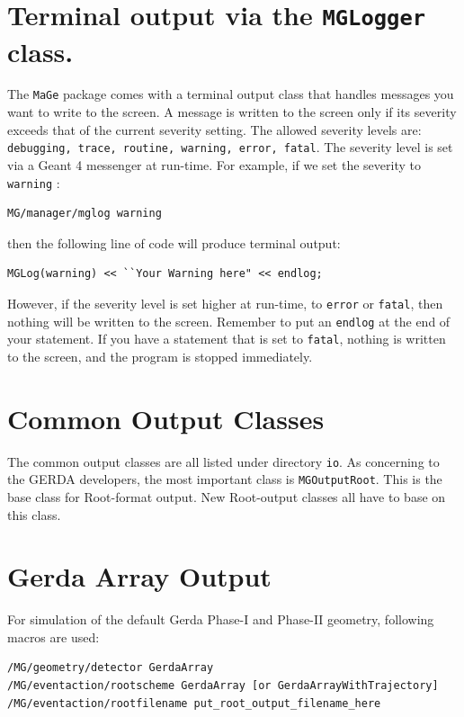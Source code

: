 \section{Terminal output via the 
 \texttt{M\-G\-L\-o\-g\-g\-e\-r} class.}
\label{IO_MGLogger}

    The \nolinkurl{MaGe} package comes with a terminal output class
   that handles messages you want to write to the screen. A message is written
   to the screen only if its severity exceeds that of the current severity 
   setting. The allowed severity levels
   are: \nolinkurl{debugging, trace, routine, warning, error, fatal}.
   The severity level is set via a Geant 4 messenger at run-{}time. 
   For example, if we set
   the severity to \nolinkurl{warning} :
 

\begin{lstlisting}
MG/manager/mglog warning
\end{lstlisting}

then the following line of code will produce terminal output:

\begin{lstlisting}
MGLog(warning) << ``Your Warning here" << endlog;
\end{lstlisting}

     However, if the severity level is set higher at run-{}time, to 
 \nolinkurl{error} or \nolinkurl{fatal}, then nothing
    will be written to the screen. Remember to put an 
 \nolinkurl{endlog} at the end of your statement. If you have a
    statement that is set to \nolinkurl{fatal}, nothing is written
    to the screen, and the program is stopped immediately.
 

\section{Common Output Classes}
\label{IO_Common}

 
The common output classes are all listed under directory \nolinkurl{io}.
As concerning to the GERDA developers, the most important class
is \nolinkurl{MGOutputRoot}. This is the base class for Root-format output.
New Root-output classes all have to base on this class. 



\section{Gerda Array Output}
\label{IO_Gerda}


For simulation of the default Gerda Phase-I and Phase-II geometry,
following macros are used:
\begin{lstlisting}
/MG/geometry/detector GerdaArray
/MG/eventaction/rootscheme GerdaArray [or GerdaArrayWithTrajectory]
/MG/eventaction/rootfilename put_root_output_filename_here
\end{lstlisting}

